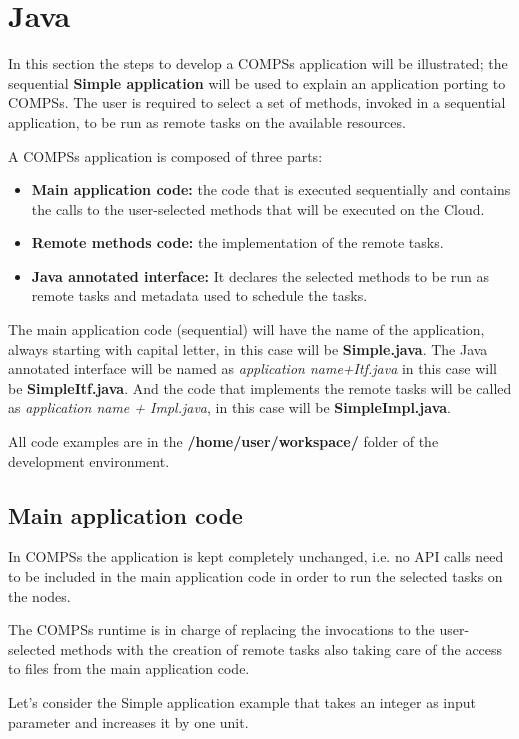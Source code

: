 \section{Java}
\label{sec:Java}

In this section the steps to develop a COMPSs application will be illustrated; the sequential {\bf Simple application}
will be used to explain an application porting to COMPSs. The user is required to select a set of
methods, invoked in a sequential application, to be run as remote tasks on the available resources.

A COMPSs application is composed of three parts:
\begin{itemize}
 \item {\bf Main application code:} the code that is executed sequentially and contains the calls to the user-selected methods that will be executed on the Cloud.
 \item {\bf Remote methods code:} the implementation of the remote tasks.
 \item {\bf Java annotated interface:} It declares the selected methods to be run as remote tasks and metadata used to schedule the tasks.
\end{itemize}

The main application code (sequential) will have the name of the application, always starting with capital
letter, in this case will be {\bf Simple.java}. The Java annotated interface will be named as {\it application name+Itf.java} 
in this case will be {\bf SimpleItf.java}. And the code that implements the remote tasks will be called as
{\it application name + Impl.java}, in this case will be {\bf SimpleImpl.java}.

All code examples are in the {\bf /home/user/workspace/} folder of the development environment.

\subsection{Main application code}

In COMPSs the application is kept completely unchanged, i.e. no API calls need to be included in the main
application code in order to run the selected tasks on the nodes.

The COMPSs runtime is in charge of replacing the invocations to the user-selected methods with the
creation of remote tasks also taking care of the access to files from the main application code.

Let’s consider the Simple application example that takes an integer as input parameter and increases it by one unit.


